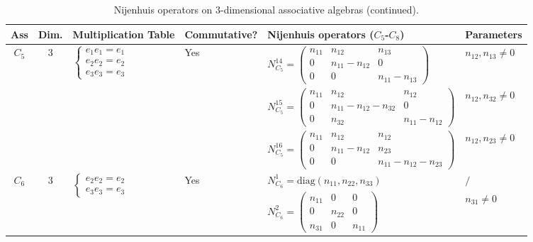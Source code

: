 \documentclass[12pt, reqno]{amsart}
\theoremstyle{plain}
\begin{document}
\begin{table}[H]
    \centering
    \tiny
    \caption{Nijenhuis operators on 3-dimensional associative algebras (continued).}
    \setlength{\tabcolsep}{1.5pt}
    \begin{tabular}{|c|c|l|l|l|l|}
    \hline
    \textbf{Ass} & \textbf{Dim.} & \textbf{Multiplication Table} & \textbf{Commutative?} & \textbf{Nijenhuis operators} ($C_5$-$C_8$) & \textbf{Parameters} \\
    \hline
    \multirow{3}{*}{$C_5$} & \multirow{3}{*}{3} & \multirow{3}{*}{$\begin{cases} e_1 e_1 = e_1 \\ e_2 e_2 = e_2 \\ e_3 e_3 = e_3 \end{cases}$} & \multirow{3}{*}{Yes} & 
    $N_{C_5}^{14} = \begin{pmatrix} n_{11} & n_{12} & n_{13} \\ 0 & n_{11}-n_{12} & 0 \\ 0 & 0 & n_{11}-n_{13} \end{pmatrix}$ & $n_{12},n_{13}\neq0$ \\
    & & & & $N_{C_5}^{15} = \begin{pmatrix} n_{11} & n_{12} & n_{12} \\ 0 & n_{11}-n_{12}-n_{32} & 0 \\ 0 & n_{32} & n_{11}-n_{12} \end{pmatrix}$ & $n_{12},n_{32}\neq0$ \\
    & & & & $N_{C_5}^{16} = \begin{pmatrix} n_{11} & n_{12} & n_{12} \\ 0 & n_{11}-n_{12} & n_{23} \\ 0 & 0 & n_{11}-n_{12}-n_{23} \end{pmatrix}$ & $n_{12},n_{23}\neq0$ \\
    \hline
    \multirow{8}{*}{$C_6$} & \multirow{8}{*}{3} & \multirow{8}{*}{$\begin{cases} e_2 e_2 = e_2 \\ e_3 e_3 = e_3 \end{cases}$} & \multirow{8}{*}{Yes} & 
    $N_{C_6}^1 = \text{diag}(n_{11}, n_{22}, n_{33})$ & $/$ \\
    & & & & $N_{C_6}^2 = \begin{pmatrix} n_{11} & 0 & 0 \\ 0 & n_{22} & 0 \\ n_{31} & 0 & n_{11} \end{pmatrix}$ & $n_{31}\neq0$ \\

\end{tabular}
\end{table}
\end{document}
